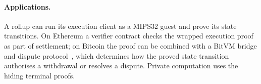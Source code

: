 \paragraph{Applications.} A rollup can run its execution client as a MIPS32 guest and prove its state transitions. On Ethereum a verifier contract checks the wrapped execution proof as part of settlement; on Bitcoin the proof can be combined with a BitVM bridge and dispute protocol~\citep{bitvm2-implementation}, which determines how the proved state transition authorises a withdrawal or resolves a dispute. Private computation uses the hiding terminal proofs.
